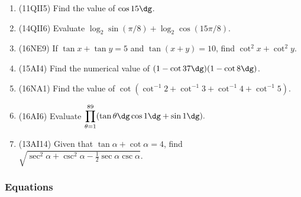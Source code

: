 \documentclass[10pt,paper=letter]{scrartcl}
\begin{document}
\begin{enumerate}

\item (11QII5) Find the value of $\cos 15\dg$.

\item (14QII6) Evaluate $\log_2 \sin(\pi/8) + \log_2 \cos(15\pi/8)$.

\item (16NE9) If $\tan x + \tan y = 5$ and $\tan(x+y) = 10$, find $\cot^2 x + \cot^2 y$.

\item (15AI4) Find the numerical value of $(1-\cot 37\dg)(1-\cot 8\dg)$.

\item (16NA1) Find the value of $\cot (\cot^{-1} 2 + \cot^{-1} 3 + \cot^{-1} 4 + \cot^{-1} 5)$.

\item (16AI6) Evaluate $\displaystyle \prod_{\theta = 1}^{89} (\tan \theta\dg \cos 1\dg + \sin 1\dg).$

\item (13AI14) Given that $\tan \alpha + \cot \alpha = 4$, find $\sqrt{\sec^2 \alpha + \csc^2 \alpha - \frac{1}{2}\sec\alpha \csc \alpha}$.


\end{enumerate}

\subsubsection*{Equations}
\end{document}
